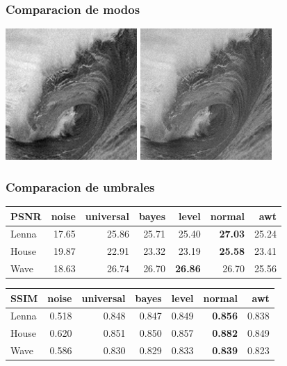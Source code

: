\documentclass{beamer}
\begin{document}
  \begin{frame}
    \frametitle{ Comparacion de modos }
    \centering
    \includegraphics[width=5cm]{imgs/Modes/2_normal_soft_sym8_Wave.jpg}
    \includegraphics[width=5cm]{imgs/Modes/2_normal_hard_sym8_Wave.jpg}

  \end{frame}

  \begin{frame}
    \frametitle{ Comparacion de umbrales }
    \centering
    \begin{tabular}{lrrrrrr}
      \toprule
      {PSNR} &  noise &  universal &  bayes &  level &  normal &    awt \\
      \midrule
      Lenna &  17.65 &      25.86 &  25.71 &  25.40 &   \bf{27.03} &  25.24 \\
      House &  19.87 &      22.91 &  23.32 &  23.19 &   \bf{25.58} &  23.41 \\
      Wave &  18.63 &      26.74 &  26.70 &  \bf{26.86} &   26.70 &  25.56 \\
      \bottomrule
      \end{tabular}
      \begin{tabular}{lrrrrrr}
        {SSIM} &  noise &  universal &  bayes &  level &  normal &    awt \\
        \midrule
        Lenna &  0.518 &   0.848 &  0.847 &  0.849 &  \bf{0.856} &  0.838 \\
        House &  0.620 &   0.851 &  0.850 &  0.857 &  \bf{0.882} &  0.849 \\
        Wave &  0.586 &   0.830 &  0.829 &  0.833 &  \bf{0.839} &  0.823 \\
        \bottomrule
        \end{tabular}



  \end{frame}
\end{document}
